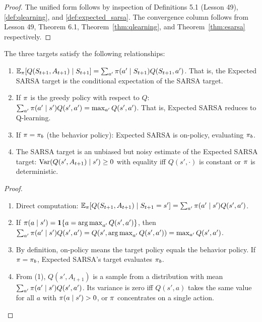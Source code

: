 \documentclass[11pt,a4paper]{article}
\begin{document}
\begin{proof}
The unified form follows by inspection of Definitions
5.1 (Lesson 49), \ref{def:qlearning}, and
\ref{def:expected_sarsa}. The convergence column follows from
Lesson 49, Theorem 6.1, Theorem~\ref{thm:qlearning}, and
Theorem~\ref{thm:esarsa} respectively.
\end{proof}

\begin{proposition}
\label{prop:target_relations}
The three targets satisfy the following relationships:
\begin{enumerate}
  \item $\mathbb{E}_\pi[Q(S_{t+1}, A_{t+1}) \mid S_{t+1}]
    = \sum_{a'} \pi(a' \mid S_{t+1}) Q(S_{t+1}, a')$.
    That is, the Expected SARSA target is the conditional
    expectation of the SARSA target.
  \item If $\pi$ is the greedy policy with respect to $Q$:
    $\sum_{a'} \pi(a' \mid s') Q(s',a')
    = \max_{a'} Q(s', a')$. That is, Expected SARSA reduces
    to Q-learning.
  \item If $\pi = \pi_b$ (the behavior policy):
    Expected SARSA is on-policy, evaluating $\pi_b$.
  \item The SARSA target is an unbiased but noisy estimate of the
    Expected SARSA target:
    $\operatorname{Var}(Q(s', A_{t+1}) \mid s') \geq 0$ with equality
    iff $Q(s', \cdot)$ is constant or $\pi$ is deterministic.
\end{enumerate}
\end{proposition}

\begin{proof}
\begin{enumerate}
  \item Direct computation:
    $\mathbb{E}_\pi[Q(S_{t+1}, A_{t+1}) \mid S_{t+1} = s']
    = \sum_{a'} \pi(a' \mid s') Q(s', a')$.
  \item If $\pi(a \mid s') = \mathbf{1}\{a = \operatorname{arg\,max}_{a'} Q(s',
    a')\}$, then $\sum_{a'} \pi(a' \mid s') Q(s', a')
    = Q(s', \operatorname{arg\,max}_{a'} Q(s', a')) = \max_{a'} Q(s', a')$.
  \item By definition, on-policy means the target policy equals
    the behavior policy. If $\pi = \pi_b$, Expected SARSA's
    target evaluates $\pi_b$.
  \item From (1), $Q(s', A_{t+1})$ is a sample from a distribution
    with mean $\sum_{a'} \pi(a' \mid s') Q(s', a')$. Its
    variance is zero iff $Q(s', a)$ takes the same value for all
    $a$ with $\pi(a \mid s') > 0$, or $\pi$ concentrates
    on a single action. \qedhere
\end{enumerate}
\end{proof}
\end{document}
